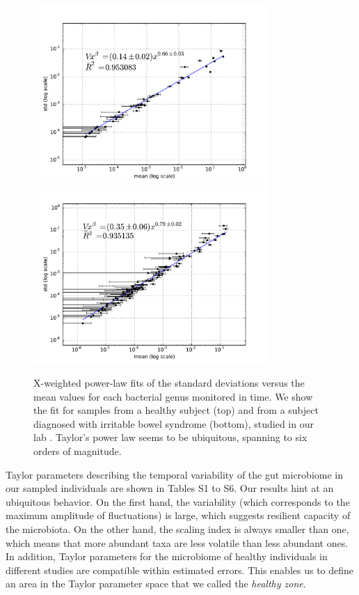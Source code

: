 \begin{figure}
	\centering
	\vspace*{-15mm} %
	\includegraphics[width=0.8\textwidth]{results/fits/IBS_h_A_amplicons_family_stdVSmean_xWboot_LOG.pdf}
	\includegraphics[width=0.8\textwidth]{results/fits/IBS_P2_Metatranscriptores_stdVSmean_xWboot_LOG.pdf}
	\caption{X-weighted power-law fits of the standard deviations versus the mean values for each bacterial genus monitored in time. We show the fit for samples from a healthy subject (top) and from a subject diagnosed with irritable bowel syndrome (bottom), studied in our lab \cite{IBS}. Taylor's power law seems to be ubiquitous, spanning to six orders of magnitude.}
	\label{fig:main1}
\end{figure}

Taylor parameters describing the temporal variability of the gut microbiome in our sampled individuals are shown in Tables S1 to S6. Our results hint at an ubiquitous behavior. On the first hand, the variability (which corresponds to the maximum amplitude of fluctuations) is large, which suggests resilient capacity of the microbiota. On the other hand, the scaling index is always smaller than one, which means that more abundant taxa are less volatile than less abundant ones. In addition, Taylor parameters for the microbiome of healthy individuals in different studies are compatible within estimated errors. This enables us to define an area in the Taylor parameter space that we called the \emph{healthy zone}. %

